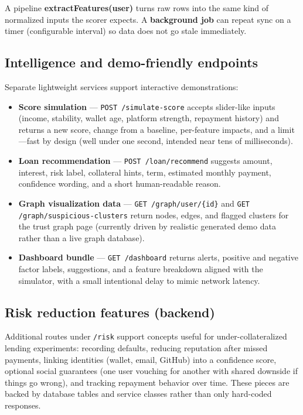 \documentclass[11pt,a4paper]{article}
\begin{document}
A pipeline \textbf{extractFeatures(user)} turns raw rows into the same kind of normalized inputs the scorer expects. A \textbf{background job} can repeat sync on a timer (configurable interval) so data does not go stale immediately.

\subsection{Intelligence and demo-friendly endpoints}
Separate lightweight services support interactive demonstrations:

\begin{itemize}[leftmargin=*]
  \item \textbf{Score simulation} --- \texttt{POST /simulate-score} accepts slider-like inputs (income, stability, wallet age, platform strength, repayment history) and returns a new score, change from a baseline, per-feature impacts, and a limit---fast by design (well under one second, intended near tens of milliseconds).
  \item \textbf{Loan recommendation} --- \texttt{POST /loan/recommend} suggests amount, interest, risk label, collateral hints, term, estimated monthly payment, confidence wording, and a short human-readable reason.
  \item \textbf{Graph visualization data} --- \texttt{GET /graph/user/\{id\}} and \texttt{GET /graph/suspicious-clusters} return nodes, edges, and flagged clusters for the trust graph page (currently driven by realistic generated demo data rather than a live graph database).
  \item \textbf{Dashboard bundle} --- \texttt{GET /dashboard} returns alerts, positive and negative factor labels, suggestions, and a feature breakdown aligned with the simulator, with a small intentional delay to mimic network latency.
\end{itemize}

\subsection{Risk reduction features (backend)}
Additional routes under \texttt{/risk} support concepts useful for under-collateralized lending experiments: recording defaults, reducing reputation after missed payments, linking identities (wallet, email, GitHub) into a confidence score, optional social guarantees (one user vouching for another with shared downside if things go wrong), and tracking repayment behavior over time. These pieces are backed by database tables and service classes rather than only hard-coded responses.
\end{document}
